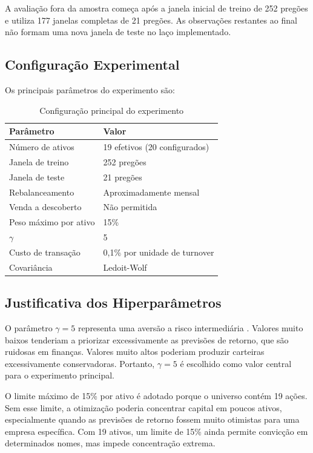 \documentclass[12pt,a4paper]{article}
\begin{document}
A avaliação fora da amostra começa após a janela inicial de treino de 252 pregões e utiliza 177 janelas completas de 21 pregões. As observações restantes ao final não formam uma nova janela de teste no laço implementado.

\subsection{Configuração Experimental}

Os principais parâmetros do experimento são:

\begin{table}[H]
\centering
\begin{tabular}{ll}
\toprule
Parâmetro & Valor \\
\midrule
Número de ativos & 19 efetivos (20 configurados) \\
Janela de treino & 252 pregões \\
Janela de teste & 21 pregões \\
Rebalanceamento & Aproximadamente mensal \\
Venda a descoberto & Não permitida \\
Peso máximo por ativo & 15\% \\
{$\gamma$} & 5 \\
Custo de transação & 0,1\% por unidade de turnover \\
Covariância & Ledoit-Wolf \\
\bottomrule
\end{tabular}
\caption{Configuração principal do experimento}
\end{table}

\subsection{Justificativa dos Hiperparâmetros}

O parâmetro $\gamma=5$ representa uma aversão a risco intermediária \cite{liu2010,bodnar2015}. Valores muito baixos tenderiam a priorizar excessivamente as previsões de retorno, que são ruidosas em finanças. Valores muito altos poderiam produzir carteiras excessivamente conservadoras. Portanto, $\gamma=5$ é escolhido como valor central para o experimento principal.

O limite máximo de 15\% por ativo é adotado porque o universo contém 19 ações. Sem esse limite, a otimização poderia concentrar capital em poucos ativos, especialmente quando as previsões de retorno fossem muito otimistas para uma empresa específica. Com 19 ativos, um limite de 15\% ainda permite convicção em determinados nomes, mas impede concentração extrema.
\end{document}
